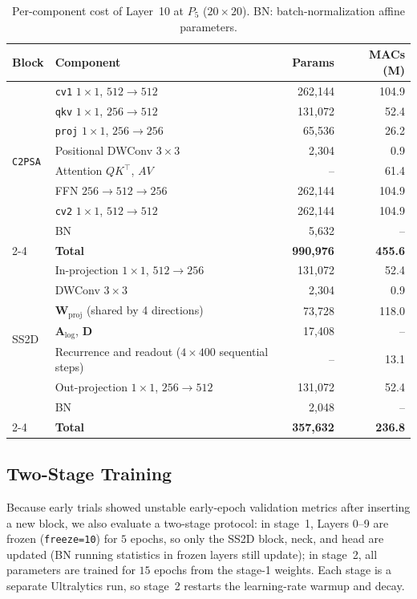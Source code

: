 \begin{table}[!t]
\caption{Per-component cost of Layer~10 at $P_5$ ($20 \times 20$). BN: batch-normalization affine parameters.}
\label{tab:layer10_breakdown}
\centering
\footnotesize
\setlength{\tabcolsep}{4pt}
\begin{tabular}{llrr}
\toprule
\textbf{Block} & \textbf{Component} & \textbf{Params} & \textbf{MACs (M)} \\
\midrule
\multirow{8}{*}{\texttt{C2PSA}} & \texttt{cv1} $1\times1$, $512 \to 512$ & 262,144 & 104.9 \\
 & \texttt{qkv} $1\times1$, $256 \to 512$ & 131,072 & 52.4 \\
 & \texttt{proj} $1\times1$, $256 \to 256$ & 65,536 & 26.2 \\
 & Positional DWConv $3\times3$ & 2,304 & 0.9 \\
 & Attention $QK^{\top}$, $AV$ & -- & 61.4 \\
 & FFN $256 \to 512 \to 256$ & 262,144 & 104.9 \\
 & \texttt{cv2} $1\times1$, $512 \to 512$ & 262,144 & 104.9 \\
 & BN & 5,632 & -- \\
\cmidrule(lr){2-4}
 & \textbf{Total} & \textbf{990,976} & \textbf{455.6} \\
\midrule
\multirow{7}{*}{SS2D} & In-projection $1\times1$, $512 \to 256$ & 131,072 & 52.4 \\
 & DWConv $3\times3$ & 2,304 & 0.9 \\
 & $\mathbf{W}_{\text{proj}}$ (shared by 4 directions) & 73,728 & 118.0 \\
 & $\mathbf{A}_{\text{log}}$, $\mathbf{D}$ & 17,408 & -- \\
 & Recurrence and readout ($4 \times 400$ sequential steps) & -- & 13.1 \\
 & Out-projection $1\times1$, $256 \to 512$ & 131,072 & 52.4 \\
 & BN & 2,048 & -- \\
\cmidrule(lr){2-4}
 & \textbf{Total} & \textbf{357,632} & \textbf{236.8} \\
\bottomrule
\end{tabular}
\end{table}

\subsection{Two-Stage Training}
\label{sec:training_workflow}
Because early trials showed unstable early-epoch validation metrics after inserting a new block, we also evaluate a two-stage protocol: in stage~1, Layers 0--9 are frozen (\texttt{freeze=10}) for $5$ epochs, so only the SS2D block, neck, and head are updated (BN running statistics in frozen layers still update); in stage~2, all parameters are trained for $15$ epochs from the stage-1 weights. Each stage is a separate Ultralytics run, so stage~2 restarts the learning-rate warmup and decay.
